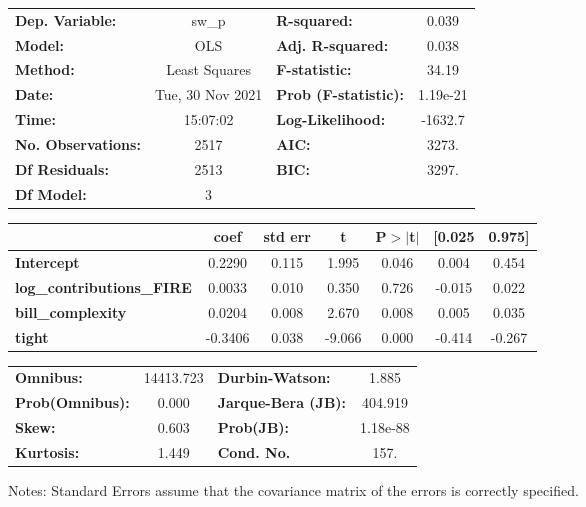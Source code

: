 \begin{center}
\begin{tabular}{lclc}
\toprule
\textbf{Dep. Variable:}           &      sw\_p       & \textbf{  R-squared:         } &     0.039   \\
\textbf{Model:}                   &       OLS        & \textbf{  Adj. R-squared:    } &     0.038   \\
\textbf{Method:}                  &  Least Squares   & \textbf{  F-statistic:       } &     34.19   \\
\textbf{Date:}                    & Tue, 30 Nov 2021 & \textbf{  Prob (F-statistic):} &  1.19e-21   \\
\textbf{Time:}                    &     15:07:02     & \textbf{  Log-Likelihood:    } &   -1632.7   \\
\textbf{No. Observations:}        &        2517      & \textbf{  AIC:               } &     3273.   \\
\textbf{Df Residuals:}            &        2513      & \textbf{  BIC:               } &     3297.   \\
\textbf{Df Model:}                &           3      & \textbf{                     } &             \\
\bottomrule
\end{tabular}
\begin{tabular}{lcccccc}
                                  & \textbf{coef} & \textbf{std err} & \textbf{t} & \textbf{P$> |$t$|$} & \textbf{[0.025} & \textbf{0.975]}  \\
\midrule
\textbf{Intercept}                &       0.2290  &        0.115     &     1.995  &         0.046        &        0.004    &        0.454     \\
\textbf{log\_contributions\_FIRE} &       0.0033  &        0.010     &     0.350  &         0.726        &       -0.015    &        0.022     \\
\textbf{bill\_complexity}         &       0.0204  &        0.008     &     2.670  &         0.008        &        0.005    &        0.035     \\
\textbf{tight}                    &      -0.3406  &        0.038     &    -9.066  &         0.000        &       -0.414    &       -0.267     \\
\bottomrule
\end{tabular}
\begin{tabular}{lclc}
\textbf{Omnibus:}       & 14413.723 & \textbf{  Durbin-Watson:     } &    1.885  \\
\textbf{Prob(Omnibus):} &    0.000  & \textbf{  Jarque-Bera (JB):  } &  404.919  \\
\textbf{Skew:}          &    0.603  & \textbf{  Prob(JB):          } & 1.18e-88  \\
\textbf{Kurtosis:}      &    1.449  & \textbf{  Cond. No.          } &     157.  \\
\bottomrule
\end{tabular}
\end{center}

Notes: \newline
 [1] Standard Errors assume that the covariance matrix of the errors is correctly specified.